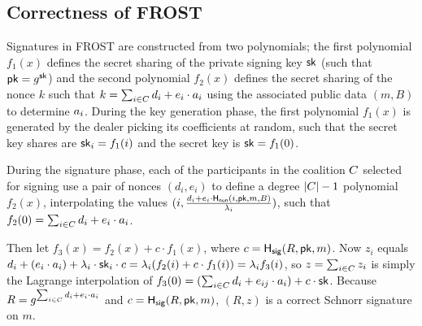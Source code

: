 \subsection{Correctness of FROST}
\label{frost:correctness}

Signatures in FROST
are constructed from two polynomials;
the first polynomial $f_1(x)$ defines the secret sharing of the private
signing key $\mathsf{sk}$ (such that $\mathsf{pk} = g^{\mathsf{sk}}$) and the
second polynomial $f_2(x)$ defines the secret sharing of the nonce $k$
such that
\(
k = \sum_{i \in C} d_i + e_i \cdot a_i
\)
using the associated public data $(m, B)$ to determine $a_i$.
During the key generation phase,
the first polynomial $f_1(x) $ is generated by the dealer picking its coefficients at random,
such that the secret key shares are $\mathsf{sk}_i = f_1(i)$ and the secret key is $\mathsf{sk} = f_1(0)$.

During the signature phase,
each of the
participants in the coalition $C$ selected for signing use a pair of nonces $(d_i, e_i)$ to
define a degree $\lvert C \rvert -1 $ polynomial $f_2(x)$, interpolating the
values $(i,\frac{d_i + e_i \cdot \mathsf{H_{non}}(i, \mathsf{pk}, m, B)}{\lambda_i})$,
such that $f_2(0) = \sum_{i \in C} d_i + e_i \cdot a_i$.

Then let $f_3(x) = f_2(x) + c \cdot f_1(x)$, where
$c = \mathsf{H_{sig}}(R, \mathsf{pk}, m)$.  Now $z_i$
equals $d_i + (e_i \cdot a_i) + \lambda_i \cdot \mathsf{sk}_i \cdot c =
\lambda_i (f_2(i) + c \cdot f_1(i)) = \lambda_i f_3(i)$, so $z = \sum_{i \in C} z_i$
is simply the Lagrange interpolation of $f_3(0) = (\sum_{i \in C} d_i + e_{ij} \cdot a_i) + c
\cdot \mathsf{sk}$.
Because $R = g^{\sum_{i \in C} d_i + e_i \cdot a_i}$ and $c
= \mathsf{H_{sig}}(R, \mathsf{pk}, m)$, $(R, z)$ is a
correct Schnorr signature on $m$.
